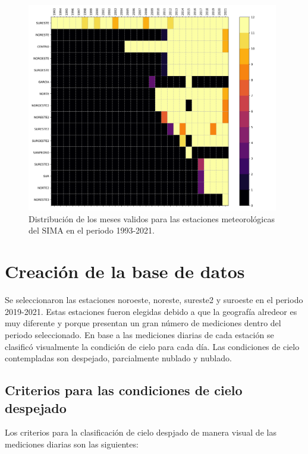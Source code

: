 \begin{figure}[H]
	\centering
	\includegraphics[width=11cm]{Graphics/Distribution_stations.png}
	\caption{Distribución de los meses validos para las estaciones meteorológicas del SIMA en el periodo 1993-2021.}
	\label{fig:distribution_data}
\end{figure}

\section{Creación de la base de datos}

Se seleccionaron las estaciones noroeste, noreste, sureste2 y suroeste en el periodo 2019-2021. Estas estaciones fueron elegidas debido a que la geografía alredeor es muy diferente y porque presentan un gran número de mediciones dentro del periodo seleccionado. En base a las mediciones diarias de cada estación se clasificó visualmente la condición de cielo para cada día. Las condiciones de cielo contempladas son despejado, parcialmente nublado y nublado.

\subsection{Criterios para las condiciones de cielo despejado}

Los criterios para la clasificación de cielo despjado de manera visual de las mediciones diarias son las siguientes:

